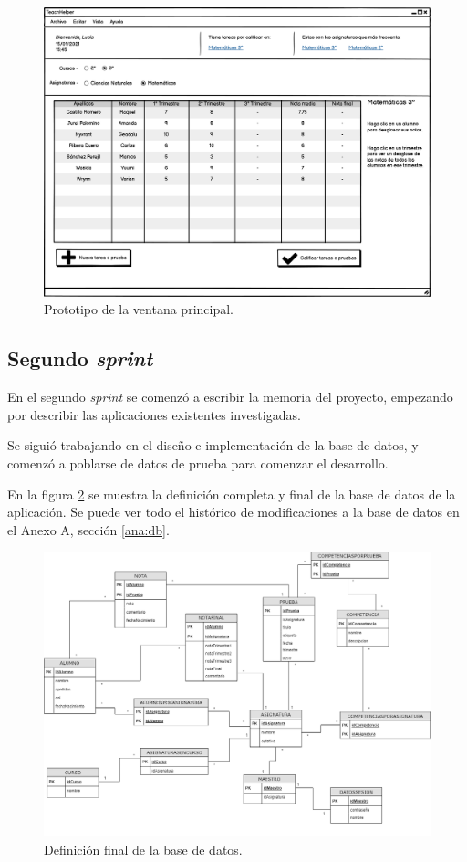 \begin{figure}[h]
\centering\includegraphics[width=1\linewidth]{figs/mockup_mainwindow.png}
\caption{Prototipo de la ventana principal.}
\label{Fig:mockup_mainwindow}
\end{figure}


\subsection{Segundo \textit{sprint}}
En el segundo \textit{sprint} se comenzó a escribir la memoria del proyecto, empezando por describir las aplicaciones existentes investigadas.

Se siguió trabajando en el diseño e implementación de la base de datos, y comenzó a poblarse de datos de prueba para comenzar el desarrollo.

En la figura \ref{Fig:db_definition6} se muestra la definición completa y final de la base de datos de la aplicación. Se puede ver todo el histórico de modificaciones a la base de datos en el Anexo A, sección \ref{ana:db}.

\begin{figure}[h]
\centering\includegraphics[width=1\linewidth]{figs/DB_Definition_6.png}
\caption{Definición final de la base de datos.}
\label{Fig:db_definition6}
\end{figure}


